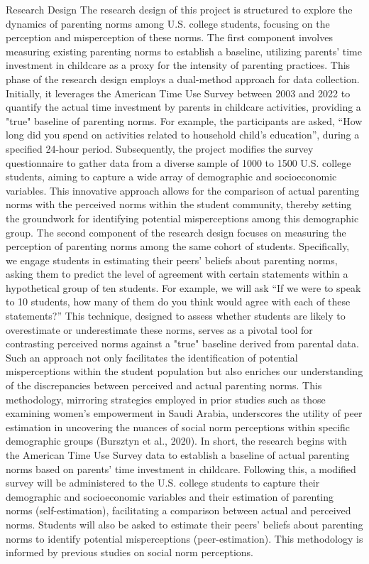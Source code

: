 Research Design
The research design of this project is structured to explore the dynamics of parenting norms among U.S. college students, focusing on the perception and misperception of these norms. The first component involves measuring existing parenting norms to establish a baseline, utilizing parents' time investment in childcare as a proxy for the intensity of parenting practices. This phase of the research design employs a dual-method approach for data collection. Initially, it leverages the American Time Use Survey between 2003 and 2022 to quantify the actual time investment by parents in childcare activities, providing a "true" baseline of parenting norms. For example, the participants are asked, “How long did you spend on activities related to household child's education”, during a specified 24-hour period. Subsequently, the project modifies the survey questionnaire to gather data from a diverse sample of 1000 to 1500 U.S. college students, aiming to capture a wide array of demographic and socioeconomic variables. This innovative approach allows for the comparison of actual parenting norms with the perceived norms within the student community, thereby setting the groundwork for identifying potential misperceptions among this demographic group.
The second component of the research design focuses on measuring the perception of parenting norms among the same cohort of students. Specifically, we engage students in estimating their peers' beliefs about parenting norms, asking them to predict the level of agreement with certain statements within a hypothetical group of ten students. For example, we will ask “If we were to speak to 10 students, how many of them do you think would agree with each of these statements?” This technique, designed to assess whether students are likely to overestimate or underestimate these norms, serves as a pivotal tool for contrasting perceived norms against a "true" baseline derived from parental data. Such an approach not only facilitates the identification of potential misperceptions within the student population but also enriches our understanding of the discrepancies between perceived and actual parenting norms. This methodology, mirroring strategies employed in prior studies such as those examining women's empowerment in Saudi Arabia, underscores the utility of peer estimation in uncovering the nuances of social norm perceptions within specific demographic groups (Bursztyn et al., 2020). In short, the research begins with the American Time Use Survey data to establish a baseline of actual parenting norms based on parents' time investment in childcare. Following this, a modified survey will be administered to the U.S. college students to capture their demographic and socioeconomic variables and their estimation of parenting norms (self-estimation), facilitating a comparison between actual and perceived norms. Students will also be asked to estimate their peers' beliefs about parenting norms to identify potential misperceptions (peer-estimation). This methodology is informed by previous studies on social norm perceptions.

